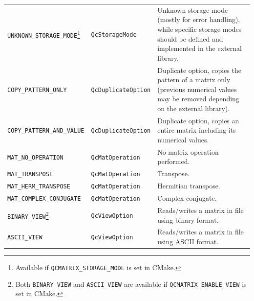 \documentclass[a4paper,11pt,twoside,openright]{book}
\begin{document}
\begin{center}
\begin{longtable}{l|l|p{}}
    \verb|UNKNOWN_STORAGE_MODE|\footnote{Available if \texttt{QCMATRIX\_STORAGE\_MODE} is set in CMake.} %
      & \verb|QcStorageMode| %
      & Unknown storage mode (mostly for error handling), while specific storage modes
        should be defined and implemented in the external library.\\
    \verb|COPY_PATTERN_ONLY| & \verb|QcDuplicateOption| %
      & Duplicate option, copies the pattern of a matrix only (previous numerical values
        may be removed depending on the external library).\\
    \verb|COPY_PATTERN_AND_VALUE| & \verb|QcDuplicateOption| %
      & Duplicate option, copies an entire matrix including its numerical values.\\
    \verb|MAT_NO_OPERATION| & \verb|QcMatOperation| & No matrix operation performed.\\
    \verb|MAT_TRANSPOSE| & \verb|QcMatOperation| & Transpose.\\
    \verb|MAT_HERM_TRANSPOSE| & \verb|QcMatOperation| & Hermitian transpose.\\
    \verb|MAT_COMPLEX_CONJUGATE| & \verb|QcMatOperation| & Complex conjugate.\\
    \verb|BINARY_VIEW|\footnote{Both \texttt{BINARY\_VIEW} and \texttt{ASCII\_VIEW}
                                are available if \texttt{QCMATRIX\_ENABLE\_VIEW} is set in CMake.} %
      & \verb|QcViewOption| & Reads/writes a matrix in file using binary format.\\
    \verb|ASCII_VIEW| & \verb|QcViewOption| & Reads/writes a matrix in file using ASCII format.\\
  \end{longtable}
\end{center}
\vspace*{-5ex}
\end{document}
